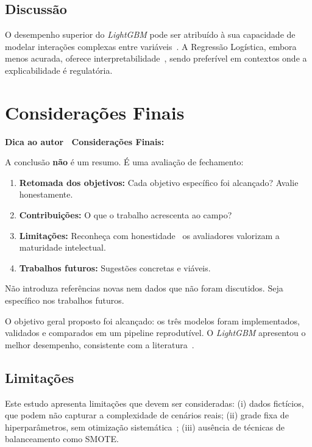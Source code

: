 \documentclass[
    12pt,
    oneside,
    a4paper,
    english,
    brazilian
    ]{abntex2}
\numberwithin{equation}{chapter}
\newenvironment{dica}{%
    \par\medskip
    \color{blue!60!black}\small\itshape
}{%
    \par\medskip
}
\begin{document}
\section{Discussão}

O desempenho superior do \textit{LightGBM} pode ser atribuído à sua capacidade de modelar interações complexas entre variáveis~\cite{kuhn2013}. A Regressão Logística, embora menos acurada, oferece interpretabilidade~\cite{geron2022}, sendo preferível em contextos onde a explicabilidade é regulatória.

\chapter{Considerações Finais}\label{cap:conclusao}

\begin{dica}
\noindent\textbf{Dica ao autor \textemdash\ Considerações Finais:}

A conclusão \textbf{não} é um resumo. É uma avaliação de fechamento:
\begin{enumerate}
    \item \textbf{Retomada dos objetivos:} Cada objetivo específico foi alcançado? Avalie honestamente.
    \item \textbf{Contribuições:} O que o trabalho acrescenta ao campo?
    \item \textbf{Limitações:} Reconheça com honestidade \textemdash\ os avaliadores valorizam a maturidade intelectual.
    \item \textbf{Trabalhos futuros:} Sugestões concretas e viáveis.
\end{enumerate}
Não introduza referências novas nem dados que não foram discutidos. Seja específico nos trabalhos futuros.
\end{dica}

O objetivo geral proposto foi alcançado: os três modelos foram implementados, validados e comparados em um pipeline reprodutível. O \textit{LightGBM} apresentou o melhor desempenho, consistente com a literatura~\cite{fernandes2023}.

\section*{Limitações}

Este estudo apresenta limitações que devem ser consideradas: (i) dados fictícios, que podem não capturar a complexidade de cenários reais; (ii) grade fixa de hiperparâmetros, sem otimização sistemática~\cite{kuhn2013}; (iii) ausência de técnicas de balanceamento como SMOTE.
\end{document}
